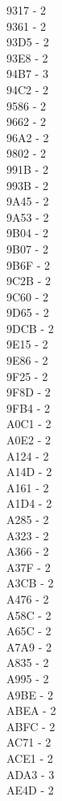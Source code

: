 \documentclass[10pt,letterpaper]{article}
\begin{document}
\begin{multicols}{5}
9317 -  2\\
9361 -  2\\
93D5 -  2\\
93E8 -  2\\
94B7 -  3\\
94C2 -  2\\
9586 -  2\\
9662 -  2\\
96A2 -  2\\
9802 -  2\\
991B -  2\\
993B -  2\\
9A45 -  2\\
9A53 -  2\\
9B04 -  2\\
9B07 -  2\\
9B6F -  2\\
9C2B -  2\\
9C60 -  2\\
9D65 -  2\\
9DCB -  2\\
9E15 -  2\\
9E86 -  2\\
9F25 -  2\\
9F8D -  2\\
9FB4 -  2\\
A0C1 -  2\\
A0E2 -  2\\
A124 -  2\\
A14D -  2\\
A161 -  2\\
A1D4 -  2\\
A285 -  2\\
A323 -  2\\
A366 -  2\\
A37F -  2\\
A3CB -  2\\
A476 -  2\\
A58C -  2\\
A65C -  2\\
A7A9 -  2\\
A835 -  2\\
A995 -  2\\
A9BE -  2\\
ABEA -  2\\
ABFC -  2\\
AC71 -  2\\
ACE1 -  2\\
ADA3 -  3\\
AE4D -  2\\

\end{multicols}
\end{document}
